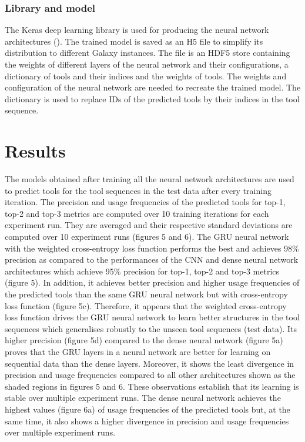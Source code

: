 \documentclass{bioinfo}
\begin{document}
\subsubsection{Library and model}
The Keras deep learning library is used for producing the neural network architectures (\cite{chollet2015keras}). The trained model is saved as an H5 file to simplify its distribution to different Galaxy instances. The file is an HDF5 store containing the weights of different layers of the neural network and their configurations, a dictionary of tools and their indices and the weights of tools. The weights and configuration of the neural network are needed to recreate the trained model. The dictionary is used to replace IDs of the predicted tools by their indices in the tool sequence.

\section{Results}
The models obtained after training all the neural network architectures are used to predict tools for the tool sequences in the test data after every training iteration. The precision and usage frequencies of the predicted tools for top-1, top-2 and top-3 metrics are computed over 10 training iterations for each experiment run. They are averaged and their respective standard deviations are computed over 10 experiment runs (figures 5 and 6). The GRU neural network with the weighted cross-entropy loss function performs the best and achieves 98\% precision as compared to the performances of the CNN and dense neural network architectures which achieve 95\% precision for top-1, top-2 and top-3 metrics (figure 5). In addition, it achieves better precision and higher usage frequencies of the predicted tools than the same GRU neural network but with cross-entropy loss function (figure 5c). Therefore, it appears that the weighted cross-entropy loss function drives the GRU neural network to learn better structures in the tool sequences which generalises robustly to the unseen tool sequences (test data). Its higher precision (figure 5d) compared to the dense neural network (figure 5a) proves that the GRU layers in a neural network are better for learning on sequential data than the dense layers. Moreover, it shows the least divergence in precision and usage frequencies compared to all other architectures shown as the shaded regions in figures 5 and 6. These observations establish that its learning is stable over multiple experiment runs. The dense neural network achieves the highest values (figure 6a) of usage frequencies of the predicted tools but, at the same time, it also shows a higher divergence in precision and usage frequencies over multiple experiment runs.
\end{document}
